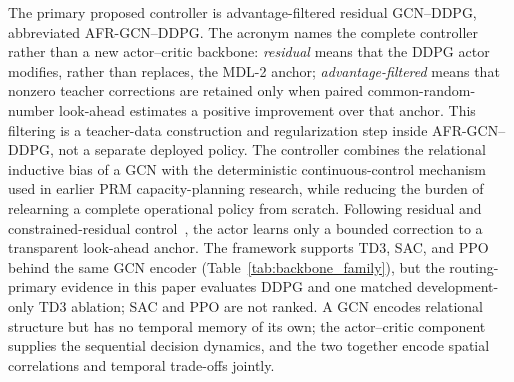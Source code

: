 \documentclass[preprint,review,12pt]{elsarticle}
\begin{document}
The primary proposed controller is advantage-filtered residual GCN--DDPG, abbreviated AFR-GCN--DDPG. The acronym names the complete controller rather than a new actor--critic backbone: \emph{residual} means that the DDPG actor modifies, rather than replaces, the MDL-2 anchor; \emph{advantage-filtered} means that nonzero teacher corrections are retained only when paired common-random-number look-ahead estimates a positive improvement over that anchor. This filtering is a teacher-data construction and regularization step inside AFR-GCN--DDPG, not a separate deployed policy. The controller combines the relational inductive bias of a GCN with the deterministic continuous-control mechanism used in earlier PRM capacity-planning research, while reducing the burden of relearning a complete operational policy from scratch. Following residual and constrained-residual control~\cite{Johannink2019ResidualRL,Staessens2022ConstrainedResidual}, the actor learns only a bounded correction to a transparent look-ahead anchor. The framework supports TD3, SAC, and PPO behind the same GCN encoder (Table~\ref{tab:backbone_family}), but the routing-primary evidence in this paper evaluates DDPG and one matched development-only TD3 ablation; SAC and PPO are not ranked. A GCN encodes relational structure but has no temporal memory of its own; the actor--critic component supplies the sequential decision dynamics, and the two together encode spatial correlations and temporal trade-offs jointly.
\end{document}
